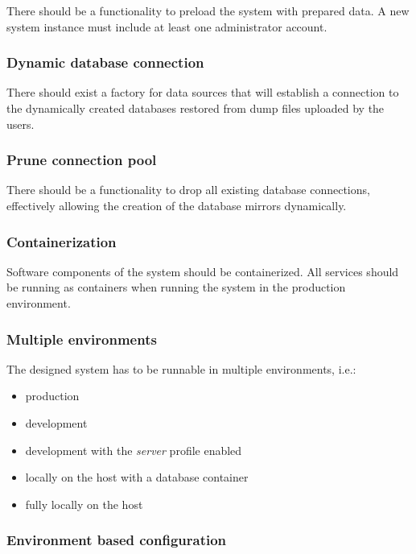\documentclass[a4paper,twoside,12pt]{book}
\begin{document}
There should be a functionality to preload the system with prepared data. A new system instance must include at least one administrator account.

\subsubsection{Dynamic database connection}

There should exist a factory for data sources that will establish a connection to the dynamically created databases restored from dump files uploaded by the users.

\subsubsection{Prune connection pool}

There should be a functionality to drop all existing database connections, effectively allowing the creation of the database mirrors dynamically.

\subsubsection{Containerization}

Software components of the system should be containerized. All services should be running as containers when running the system in the production environment.

\subsubsection{Multiple environments}

The designed system has to be runnable in multiple environments, i.e.:

\begin{itemize}
\item production
\item development
\item development with the \textit{server} profile enabled
\item locally on the host with a database container
\item fully locally on the host
\end{itemize}

\subsubsection{Environment based configuration}
\end{document}

